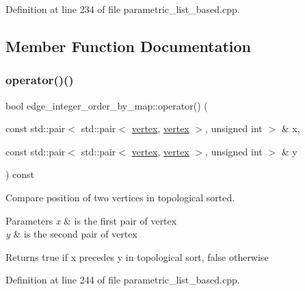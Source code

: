 Definition at line 234 of file parametric\+\_\+list\+\_\+based.\+cpp.



\subsection{Member Function Documentation}
\mbox{\label{classedge__integer__order__by__map_a435b16cd11eeb9cefab8034cd49339ab}} 
\subsubsection{\texorpdfstring{operator()()}{operator()()}}
{\footnotesize\ttfamily bool edge\+\_\+integer\+\_\+order\+\_\+by\+\_\+map\+::operator() (\begin{DoxyParamCaption}\item[{const std\+::pair$<$ std\+::pair$<$ \hyperlink{graph_8hpp_abefdcf0544e601805af44eca032cca14}{vertex}, \hyperlink{graph_8hpp_abefdcf0544e601805af44eca032cca14}{vertex} $>$, unsigned int $>$ \&}]{x,  }\item[{const std\+::pair$<$ std\+::pair$<$ \hyperlink{graph_8hpp_abefdcf0544e601805af44eca032cca14}{vertex}, \hyperlink{graph_8hpp_abefdcf0544e601805af44eca032cca14}{vertex} $>$, unsigned int $>$ \&}]{y }\end{DoxyParamCaption}) const\hspace{0.3cm}{\ttfamily [inline]}}



Compare position of two vertices in topological sorted. 


\begin{DoxyParams}{Parameters}
{\em x} & is the first pair of vertex \\
\hline
{\em y} & is the second pair of vertex \\
\hline
\end{DoxyParams}
\begin{DoxyReturn}{Returns}
true if x precedes y in topological sort, false otherwise 
\end{DoxyReturn}


Definition at line 244 of file parametric\+\_\+list\+\_\+based.\+cpp.




